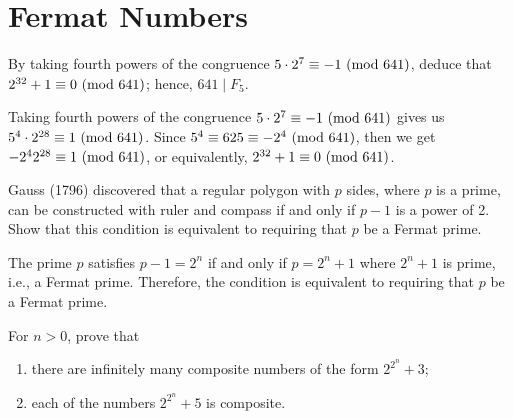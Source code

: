 \section{Fermat Numbers}

\begin{exercise}
    By taking fourth powers of the congruence $5\cdot 2^7 \equiv -1 \ (\mathrm{mod}\ 641)$, deduce that $2^{32} + 1 \equiv 0 \ (\mathrm{mod}\ 641)$; hence, $641 \mid F_5$. \\
\end{exercise}

\begin{solution}
    Taking fourth powers of the congruence $5 \cdot 2^7 \equiv -1 \ (\mathrm{mod}\ 641)$ gives us $5^4 \cdot 2^{28} \equiv 1 \ (\mathrm{mod}\ 641)$. Since $5^4 \equiv 625 \equiv -2^4 \ (\mathrm{mod}\ 641)$, then we get $-2^{4}2^{28} \equiv 1 \ (\mathrm{mod}\ 641)$, or equivalently, $2^{32} + 1 \equiv 0 \ (\mathrm{mod}\ 641)$.\\
\end{solution}

\begin{exercise}
    Gauss (1796) discovered that a regular polygon with $p$ sides, where $p$ is a prime, can be constructed with ruler and compass if and only if $p-1$ is a power of 2. Show that this condition is equivalent to requiring that $p$ be a Fermat prime. \\
\end{exercise}

\begin{solution}
    The prime $p$ satisfies $p-1 = 2^n$ if and only if $p = 2^n + 1$ where $2^n + 1$ is prime, i.e., a Fermat prime. Therefore, the condition is equivalent to requiring that $p$ be a Fermat prime.  \\
\end{solution}

\begin{exercise}
    For $n > 0$, prove that
    \begin{enumerate}
        \item there are infinitely many composite numbers of the form $2^{2^n} + 3$; 
        \item each of the numbers $2^{2^n} + 5$ is composite. \\
    \end{enumerate}
\end{exercise}

